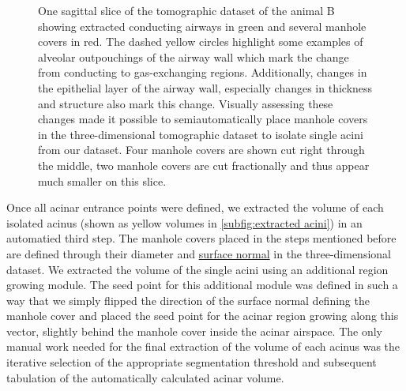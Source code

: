 \documentclass[%
	twoside,
	paper=a4,%
	abstract=true,%
	]{scrartcl}
\newlength\imagescale		%
\begin{document}
\begin{figure}
%
	\caption{One sagittal slice of the tomographic dataset of the animal B showing extracted conducting airways in green and several manhole covers in red. The dashed yellow circles highlight some examples of alveolar outpouchings of the airway wall which mark the change from conducting to gas-exchanging regions. Additionally, changes in the epithelial layer of the airway wall, especially changes in thickness and structure also mark this change. Visually assessing these changes made it possible to semiautomatically place manhole covers in the three-dimensional tomographic dataset to isolate single acini from our dataset. Four manhole covers are shown cut right through the middle, two manhole covers are cut fractionally and thus appear much smaller on this slice.}
	\label{fig:ManholeCoverExplanation}
\end{figure}

Once all acinar entrance points were defined, we extracted the volume of each isolated acinus (shown as yellow volumes in \autoref{subfig:extracted acini}) in an automatied third step. The manhole covers placed in the steps mentioned before are defined through their diameter and \href{https://secure.wikimedia.org/wikipedia/en/w/index.php?title=Surface_normal&oldid=411684319}{surface normal} in the three-dimensional dataset. We extracted the volume of the single acini using an additional region growing module. The seed point for this additional module was defined in such a way that we simply flipped the direction of the surface normal defining the manhole cover and placed the seed point for the acinar region growing along this vector, slightly behind the manhole cover inside the acinar airspace. The only manual work needed for the final extraction of the volume of each acinus was the iterative selection of the appropriate segmentation threshold and subsequent tabulation of the automatically calculated acinar volume.
\end{document}
